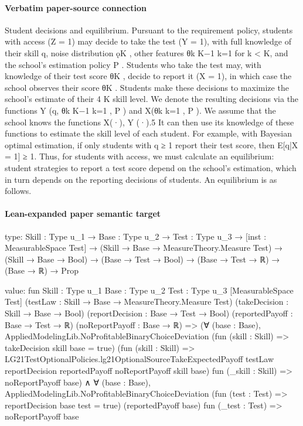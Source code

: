 \documentclass[10pt]{article}
\begin{document}
\paragraph{Verbatim paper-source connection}
\begin{ReviewVerbatim}
Student decisions and equilibrium. Pursuant to the requirement policy, students with access
(Z = 1) may decide to take the test (Y = 1), with full knowledge of their skill q, noise distribution
ǫK , other features {θk }K−1
k=1 for k < K, and the school’s estimation policy P . Students who take the
test may, with knowledge of their test score θK , decide to report it (X = 1), in which case the school
observes their score θK . Students make these decisions to maximize the school’s estimate of their
4
K
skill level. We denote the resulting decisions via the functions Y (q, {θk }K−1
k=1 , P ) and X({θk }k=1 , P ).
We assume that the school knows the functions X(·), Y (·).5 It can then use its knowledge of
these functions to estimate the skill level of each student. For example, with Bayesian optimal
estimation, if only students with q ≥ 1 report their test score, then E[q|X = 1] ≥ 1.
Thus, for students with access, we must calculate an equilibrium: student strategies to report a
test score depend on the school’s estimation, which in turn depends on the reporting decisions of
students. An equilibrium is as follows.
\end{ReviewVerbatim}



\paragraph{Lean-expanded paper semantic target}
\begin{ReviewVerbatim}
type:
{Skill : Type u_1} →
  {Base : Type u_2} →
    {Test : Type u_3} →
      [inst : MeasurableSpace Test] →
        (Skill → Base → MeasureTheory.Measure Test) →
          (Skill → Base → Bool) → (Base → Test → Bool) → (Base → Test → ℝ) → (Base → ℝ) → Prop

value:
fun {Skill : Type u_1} {Base : Type u_2} {Test : Type u_3} [MeasurableSpace Test]
    (testLaw : Skill → Base → MeasureTheory.Measure Test) (takeDecision : Skill → Base → Bool)
    (reportDecision : Base → Test → Bool) (reportedPayoff : Base → Test → ℝ) (noReportPayoff : Base → ℝ) =>
  (∀ (base : Base),
      AppliedModelingLib.NoProfitableBinaryChoiceDeviation (fun (skill : Skill) => takeDecision skill base = true)
        (fun (skill : Skill) =>
          LG21TestOptionalPolicies.lg21OptionalSourceTakeExpectedPayoff testLaw reportDecision reportedPayoff
            noReportPayoff skill base)
        fun (_skill : Skill) => noReportPayoff base) ∧
    ∀ (base : Base),
      AppliedModelingLib.NoProfitableBinaryChoiceDeviation (fun (test : Test) => reportDecision base test = true)
        (reportedPayoff base) fun (_test : Test) => noReportPayoff base
\end{ReviewVerbatim}
\end{document}
